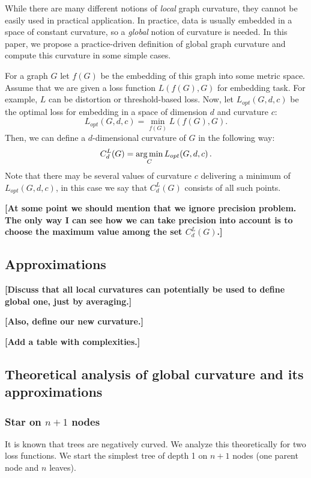 \documentclass{article} %
\begin{document}
While there are many different notions of \textit{local} graph curvature, they cannot be easily used in practical application. In practice, data is usually embedded in a space of constant curvature, so a \textit{global} notion of curvature is needed. 
In this paper, we propose a practice-driven definition of global graph curvature and compute this curvature in some simple cases.

For a graph $G$ let $f(G)$ be the embedding of this graph into some metric space. Assume that we are given a loss function $L(f(G),G)$ for embedding task. For example, $L$ can be distortion or threshold-based loss. 
Now, let $L_{opt}(G,d,c)$ be the optimal loss for embedding in a space of dimension $d$ and curvature $c$:
\[
L_{opt}(G,d,c) = \min_{f(G)} L(f(G),G).
\]
Then, we can define a $d$-dimensional curvature of $G$ in the following way:
\[
C_{d}^{L}(G) = \operatorname*{arg\,min}_C L_{opt}(G,d,c)\,.
\]
Note that there may be several values of curvature $c$ delivering a minimum of $L_{opt}(G,d,c)$, in this case we say that  $C_{d}^{L}(G)$ consists of all such points.

\textbf{[At some point we should mention that we ignore precision problem. The only way I can see how we can take precision into account is to choose the maximum value among the set $C_d^L(G)$.]}

\subsection{Approximations}

\textbf{[Discuss that all local curvatures can potentially be used to define global one, just by averaging.]} 

\textbf{[Also, define our new curvature.]}

\textbf{[Add a table with complexities.]}

\subsection{Theoretical analysis of global curvature and its approximations}

\subsubsection{Star on $n+1$ nodes}

It is known that trees are negatively curved. 
We analyze this theoretically for two loss functions. We start the simplest tree of depth 1 on $n+1$ nodes (one parent node and $n$ leaves).
\end{document}
